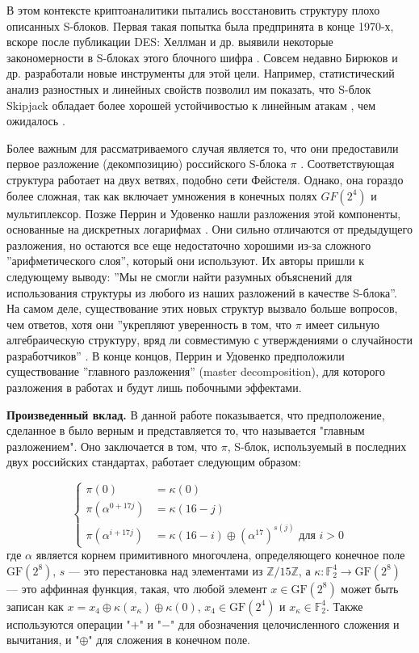В этом контексте криптоаналитики пытались восстановить структуру плохо описанных S-блоков. Первая такая попытка была предпринята в конце 1970-х, вскоре после публикации DES: Хеллман и др. выявили некоторые закономерности в S-блоках этого блочного шифра \cite{HMS76}. Совсем недавно Бирюков и др. разработали новые инструменты для этой цели. Например, статистический анализ разностных и линейных свойств позволил им показать, что S-блок Skipjack обладает более хорошей устойчивостью к линейным атакам \cite{Mat94}, чем ожидалось \cite{BP15}.

Более важным для рассматриваемого случая является то, что они предоставили первое разложение (декомпозицию) российского S-блока \(\pi\) \cite{BPU16a, BPU16b}. Соответствующая структура работает на двух ветвях, подобно сети Фейстеля. Однако, она гораздо более сложная, так как включает умножения в конечных полях \(GF(2^4)\) и мультиплексор. Позже Перрин и Удовенко нашли разложения этой компоненты, основанные на дискретных логарифмах \cite{PU16}. Они сильно отличаются от предыдущего разложения, но остаются все еще недостаточно хорошими из-за сложного ''арифметического слоя'', который они используют. Их авторы пришли к следующему выводу: ''Мы не смогли найти разумных объяснений для использования структуры из любого из наших разложений в качестве S-блока''. На самом деле, существование этих новых структур вызвало больше вопросов, чем ответов, хотя они ''укрепляют уверенность в том, что \(\pi\) имеет сильную алгебраическую структуру, вряд ли совместимую с утверждениями о случайности разработчиков'' \cite{PU16}. В конце концов, Перрин и Удовенко предположили существование ''главного разложения'' (master decomposition), для которого разложения в работах \cite{BPU16a} и \cite{PU16} будут лишь побочными эффектами.

\textbf{Произведенный вклад.} В данной работе показывается, что предположение, сделанное в \cite{PU16} было верным и представляется то, что называется "главным разложением". Оно заключается в том, что \(\pi\), S-блок, используемый в последних двух российских стандартах, работает следующим образом:

$$
\begin{cases}\pi(0) & =\kappa(0) \\ \pi\left(\alpha^{0+17 j}\right) & =\kappa(16-j) \\ \pi\left(\alpha^{i+17 j}\right) & =\kappa(16-i) \oplus\left(\alpha^{17}\right)^{s(j)} \text { для } i>0\end{cases}
$$
где \(\alpha\) является корнем примитивного многочлена, определяющего конечное поле \(\text{GF}(2^8)\), \(s\) — это перестановка над элементами из \( \mathbb{Z}/15\mathbb{Z} \), а \(\kappa: \mathbb{F}_2^4 \to \text{GF}(2^8)\) — это аффинная функция, такая, что любой элемент \(x \in \text{GF}(2^8)\) может быть записан как \(x = x_4 \oplus \kappa(x_\kappa) \oplus \kappa(0)\), \(x_4 \in \text{GF}(2^4)\) и \(x_\kappa \in \mathbb{F}_2^4\). Также используются операции "$+$" и "$-$" для обозначения целочисленного сложения и вычитания, и "$\oplus$" для сложения в конечном поле.

